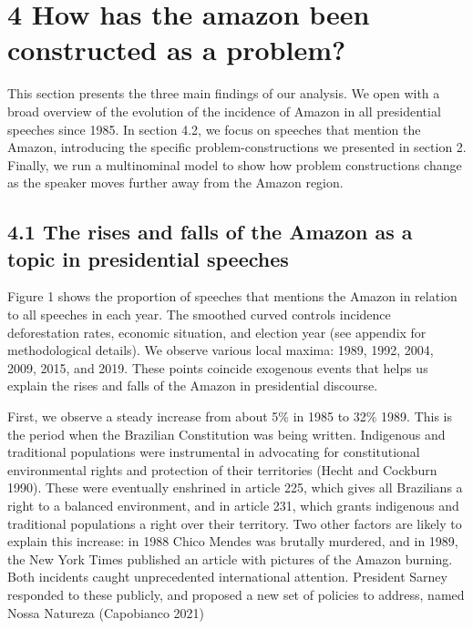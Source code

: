 \documentclass[
]{article}
\begin{document}
\hypertarget{how-has-the-amazon-been-constructed-as-a-problem}{%
\section{4 How has the amazon been constructed as a
problem?}\label{how-has-the-amazon-been-constructed-as-a-problem}}

This section presents the three main findings of our analysis. We open
with a broad overview of the evolution of the incidence of Amazon in all
presidential speeches since 1985. In section 4.2, we focus on speeches
that mention the Amazon, introducing the specific problem-constructions
we presented in section 2. Finally, we run a multinominal model to show
how problem constructions change as the speaker moves further away from
the Amazon region.

\hypertarget{the-rises-and-falls-of-the-amazon-as-a-topic-in-presidential-speeches}{%
\subsection{4.1 The rises and falls of the Amazon as a topic in
presidential
speeches}\label{the-rises-and-falls-of-the-amazon-as-a-topic-in-presidential-speeches}}

Figure 1 shows the proportion of speeches that mentions the Amazon in
relation to all speeches in each year. The smoothed curved controls
incidence deforestation rates, economic situation, and election year
(see appendix for methodological details). We observe various local
maxima: 1989, 1992, 2004, 2009, 2015, and 2019. These points coincide
exogenous events that helps us explain the rises and falls of the Amazon
in presidential discourse.

First, we observe a steady increase from about 5\% in 1985 to 32\% 1989.
This is the period when the Brazilian Constitution was being written.
Indigenous and traditional populations were instrumental in advocating
for constitutional environmental rights and protection of their
territories (Hecht and Cockburn 1990). These were eventually enshrined
in article 225, which gives all Brazilians a right to a balanced
environment, and in article 231, which grants indigenous and traditional
populations a right over their territory. Two other factors are likely
to explain this increase: in 1988 Chico Mendes was brutally murdered,
and in 1989, the New York Times published an article with pictures of
the Amazon burning. Both incidents caught unprecedented international
attention. President Sarney responded to these publicly, and proposed a
new set of policies to address, named Nossa Natureza (Capobianco 2021)
\end{document}
